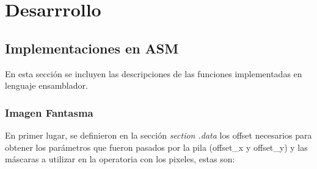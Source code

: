 \documentclass[a4paper]{article}
\begin{document}
\section{Desarrrollo}

\subsection{Implementaciones en ASM}
\justify
En esta sección se incluyen las descripciones de las funciones implementadas en lenguaje ensamblador.

\subsubsection{Imagen Fantasma}
\justify
En primer lugar, se definieron en la sección \textit{section .data} los offset necesarios para obtener los parámetros que fueron pasados por la pila (offset_x y offset_y) y las máscaras a utilizar en la operatoria con los pixeles, estas son:
\end{document}
